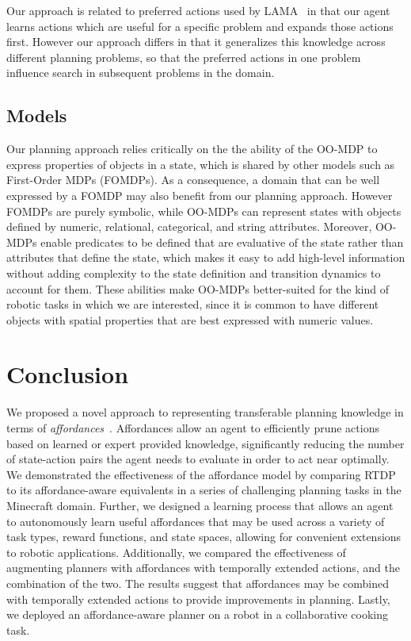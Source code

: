 \documentclass[letterpaper]{article}
\begin{document}
Our approach is related to preferred actions used by
LAMA~\citep{richter10} in that our agent learns actions which are
useful for a specific problem and expands those actions first.
However our approach differs in that it generalizes this knowledge
across different planning problems, so that the preferred actions in
one problem influence search in subsequent problems in the domain.

\subsection{Models}
Our planning approach relies critically on the the ability of the OO-MDP to express properties of objects in a state, which is shared by other models such as First-Order MDPs (FOMDPs). As a consequence, a domain that can be well expressed by a FOMDP may also benefit from our planning approach. However FOMDPs are purely symbolic, while OO-MDPs can represent states with objects defined by numeric, relational, categorical, and string attributes. Moreover, OO-MDPs enable predicates to be defined that are evaluative of the state rather than attributes that define the state, which makes it easy to add high-level information without adding complexity to the state definition and transition dynamics to account for them. These abilities make OO-MDPs better-suited for the kind of robotic tasks in which we are interested, since it is common to have different objects with spatial properties that are best expressed with numeric values.


\section{Conclusion}
\label{sec:conclusion}
We proposed a novel approach to representing transferable planning
knowledge in terms of {\em affordances}~\cite{gibson77}. Affordances
allow an agent to efficiently prune actions based on learned or expert
provided knowledge, significantly reducing the number of state-action
pairs the agent needs to evaluate in order to act near optimally. We
demonstrated the effectiveness of the affordance model by comparing
RTDP to its affordance-aware equivalents in a series of challenging
planning tasks in the Minecraft domain. Further, we designed a
learning process that allows an agent to autonomously learn useful
affordances that may be used across a variety of task types, reward
functions, and state spaces, allowing for convenient extensions to
robotic applications.  Additionally, we compared the effectiveness of
augmenting planners with affordances with temporally extended actions,
and the combination of the two. The results suggest that affordances
may be combined with temporally extended actions to provide
improvements in planning.  Lastly, we deployed an affordance-aware
planner on a robot in a collaborative cooking task.
\end{document}

